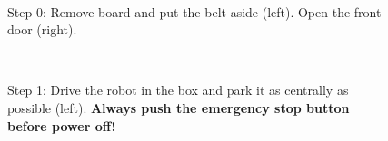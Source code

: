 \begin{figure}[!ht]
\mbox{\quad
{}}
\caption{Step 0: Remove board and put the belt aside (left). Open the front door (right).} %
\end{figure}

\begin{figure}[!ht]
\centering
\mbox{\quad
{}}
\caption{Step 1: Drive the robot in the box and park it as centrally as possible (left). {\bf Always push the emergency stop button before power off!}} %
\end{figure}

